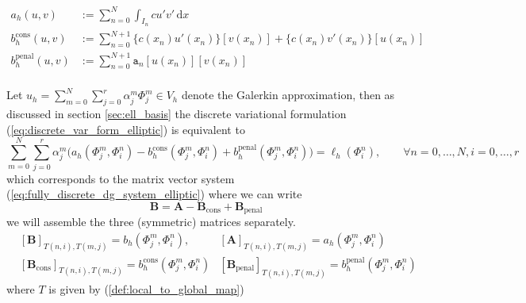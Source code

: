 \begin{align*}
	a_h(u,v)                & := \sum_{n=0}^N \int_{I_n} cu'v'\, \text{d}x                              \\
	b_h^{\text{cons}}(u,v)  & := \sum_{n=0}^{N+1} \{c(x_n)u'(x_n)\}[v(x_n)] + \{c(x_n)v'(x_n)\}[u(x_n)] \\
	b_h^{\text{penal}}(u,v) & := \sum_{n=0}^{N+1} \texttt{a}_n[u(x_n)][v(x_n)]                          \\
\end{align*}

Let $\displaystyle u_h = \sum_{m=0}^{N} \sum_{j=0}^{r} \alpha_j^m \Phi_j^m \in V_h$ denote
the Galerkin approximation, then as discussed in section \ref{sec:ell_basis} the discrete variational formulation (\ref{eq:discrete_var_form_elliptic}) is equivalent
to
\begin{equation}
	\sum_{m=0}^{N} \sum_{j=0}^{r} \alpha_j^m \Big(
	a_h(\Phi_j^m,\Phi_i^n) - b_h^{\text{cons}}(\Phi_j^m,\Phi_i^n) + b_h^{\text{penal}}(\Phi_j^m,\Phi_i^n)
	\Big)
	= \ell_h(\Phi_i^n), \qquad \forall n=0,\ldots,N, i=0,\ldots,r
\end{equation}
which corresponds to the matrix vector system (\ref{eq:fully_discrete_dg_system_elliptic})
where we can write
\begin{equation*}
	\textbf{B} = \textbf{A} - \textbf{B}_{\text{cons}} + \textbf{B}_{\text{penal}}
\end{equation*}
we will assemble the three (symmetric) matrices separately.
\begin{align*}
	 & [\textbf{B}]_{T(n,i),T(m,j)} = b_h(\Phi_j^m, \Phi_i^n),
	 & [\textbf{A}]_{T(n,i),T(m,j)} = a_h(\Phi_j^m, \Phi_i^n)                                \\
	 & [\textbf{B}_{\text{cons}}]_{T(n,i),T(m,j)} = b_h^{\text{cons}} (\Phi_j^m, \Phi_i^n)
	 & [\textbf{B}_{\text{penal}}]_{T(n,i),T(m,j)} = b_h^{\text{penal}} (\Phi_j^m, \Phi_i^n)
\end{align*}
where $T$ is given by (\ref{def:local_to_global_map})

